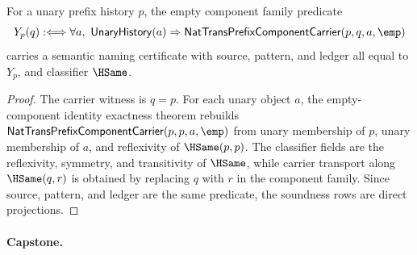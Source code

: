 \begin{theorem}
\label{thm:yoneda-representable-empty-component-family-semantic-namecert}
For a unary prefix history $p$, the empty component family predicate
$$
Y_p(q) :\Longleftrightarrow
\forall a,\ \mathsf{UnaryHistory}(a)\Rightarrow
\mathsf{NatTransPrefixComponentCarrier}(p,q,a,\emp)
$$
carries a semantic naming certificate with source, pattern, and ledger all
equal to $Y_p$, and classifier $\HSame$.
\end{theorem}
\begin{proof}
The carrier witness is $q=p$. For each unary object $a$, the empty-component
identity exactness theorem rebuilds
$\mathsf{NatTransPrefixComponentCarrier}(p,p,a,\emp)$ from unary membership of
$p$, unary membership of $a$, and reflexivity of $\HSame(p,p)$. The classifier
fields are the reflexivity, symmetry, and transitivity of $\HSame$, while
carrier transport along $\HSame(q,r)$ is obtained by replacing $q$ with $r$ in
the component family. Since source, pattern, and ledger are the same predicate,
the soundness rows are direct projections.
\end{proof}

\paragraph{Capstone.}

